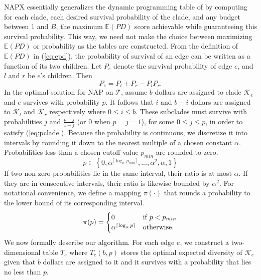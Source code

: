 \documentclass[10pt]{llncs}       \usepackage{graphicx,subfigure}
\begin{document}
NAPX essentially generalizes the dynamic programming table of
\cite{pardi07} by computing for each clade, each desired survival probability
of the clade, and any budget between 1 and $B$, the maximum $\mathbb{E}(PD)$
score achievable while guaranteeing this survival probability.
  This way, we need not make the 
choice between maximizing $\mathbb{E}(PD)$ or probability as the tables
are constructed.  From the definition of
$\mathbb{E}(PD)$ in (\ref{eq:epd}), the probability of survival of
an edge can be written as a function of its two children.  Let $P_e$
denote the survival probability of edge $e$, and $l$ and $r$ be $e$'s children.
Then
\begin{equation}
\label{eq:pclade}
P_e = P_l + P_r - P_l P_r.
\end{equation}  
In the optimal solution for NAP on $\mathcal{T}$,
 assume $b$ dollars are assigned to clade $\mathcal{K}_e$ and 
$e$ survives with probability
$p$.  It follows that $i$ and $b-i$ dollars
are assigned to $\mathcal{K}_l$ and $\mathcal{K}_r$ respectively where
$0 \leq i \leq b$.  These subclades must survive with probabilities 
$j$ and $\frac{p-j}{1-j}$ (or 0 when $p=j=1$), 
for some $0 \leq j \leq p$, in order to 
satisfy (\ref{eq:pclade}). Because 
the probability is continuous, we discretize it into intervals by rounding it
down to the nearest
multiple of a chosen constant $\alpha$. Probabilities less than a chosen 
cutoff value $p_{min}$ are rounded to zero.
\begin{equation*}
  p \in \left\{ 0, \alpha^{\lceil \log_\alpha{p_{min}} \rceil}, ...,
  \alpha^2, \alpha,  1  \right\}
\end{equation*}
If two non-zero probabilities lie in the same interval, their ratio is at most 
$\alpha$. If they are in consecutive intervals, their ratio is likewise bounded
by $\alpha^2$.  For notational convenience, we define a mapping $\pi(\cdot)$
that rounds a probability to the lower bound of its corresponding interval.
\begin{equation*}
  \pi(p) =
  \begin{cases}
    0 & \text{if}~ p < p_{min} \cr
    \alpha^{\lceil \log_\alpha p \rceil} & \text{otherwise.}
  \end{cases}
\end{equation*}
We now formally describe our algorithm.  For each edge $e$, we construct
a two-dimensional table $T_e$ where $T_e(b,p)$ stores the optimal expected
diversity of $\mathcal{K}_e$ given that $b$ dollars are assigned to it and
 it survives with a probability that lies no less than $p$.
\end{document}
